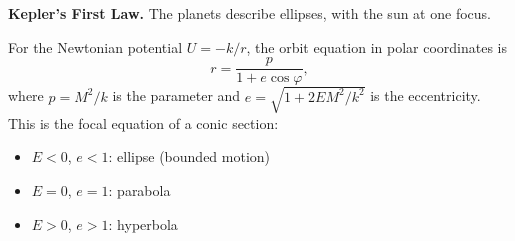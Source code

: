 \textbf{Kepler's First Law.} The planets describe ellipses, with the sun at one focus.

For the Newtonian potential $U = -k/r$, the orbit equation in polar coordinates is
$$r = \frac{p}{1 + e \cos \varphi},$$
where $p = M^2/k$ is the parameter and $e = \sqrt{1 + 2EM^2/k^2}$ is the eccentricity. This is the focal equation of a conic section:
\begin{itemize}
\item $E < 0$, $e < 1$: ellipse (bounded motion)
\item $E = 0$, $e = 1$: parabola
\item $E > 0$, $e > 1$: hyperbola
\end{itemize}
